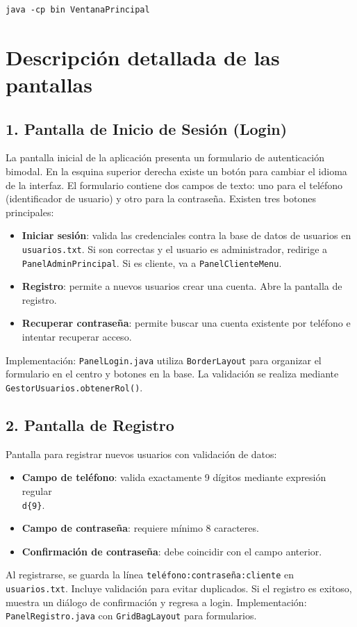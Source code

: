 \documentclass[12pt,a4paper]{report}
\begin{document}
\begin{verbatim}
java -cp bin VentanaPrincipal
\end{verbatim}

\section{Descripción detallada de las pantallas}

\subsection{1. Pantalla de Inicio de Sesión (Login)}
La pantalla inicial de la aplicación presenta un formulario de autenticación bimodal. En la esquina superior derecha existe un botón para cambiar el idioma de la interfaz. El formulario contiene dos campos de texto: uno para el teléfono (identificador de usuario) y otro para la contraseña. Existen tres botones principales:
\begin{itemize}
    \item \textbf{Iniciar sesión}: valida las credenciales contra la base de datos de usuarios en \texttt{usuarios.txt}. Si son correctas y el usuario es administrador, redirige a \texttt{PanelAdminPrincipal}. Si es cliente, va a \texttt{PanelClienteMenu}.
    \item \textbf{Registro}: permite a nuevos usuarios crear una cuenta. Abre la pantalla de registro.
    \item \textbf{Recuperar contraseña}: permite buscar una cuenta existente por teléfono e intentar recuperar acceso.
\end{itemize}
Implementación: \texttt{PanelLogin.java} utiliza \texttt{BorderLayout} para organizar el formulario en el centro y botones en la base. La validación se realiza mediante \texttt{GestorUsuarios.obtenerRol()}.

\subsection{2. Pantalla de Registro}
Pantalla para registrar nuevos usuarios con validación de datos:
\begin{itemize}
    \item \textbf{Campo de teléfono}: valida exactamente 9 dígitos mediante expresión regular \texttt{\\d\{9\}}.
    \item \textbf{Campo de contraseña}: requiere mínimo 8 caracteres.
    \item \textbf{Confirmación de contraseña}: debe coincidir con el campo anterior.
\end{itemize}
Al registrarse, se guarda la línea \texttt{teléfono:contraseña:cliente} en \texttt{usuarios.txt}. Incluye validación para evitar duplicados. Si el registro es exitoso, muestra un diálogo de confirmación y regresa a login. Implementación: \texttt{PanelRegistro.java} con \texttt{GridBagLayout} para formularios.
\end{document}

